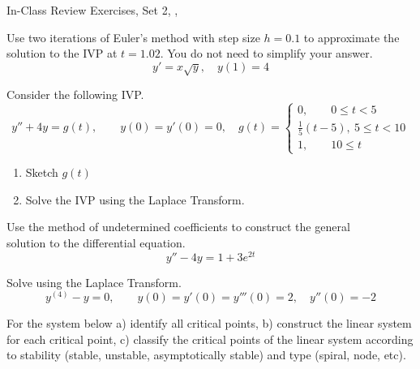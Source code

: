 \documentclass[12pt]{exam}
\newcommand{\TestName}{In-Class Review Exercises, Set 2}
\begin{document}
    

\begin{center}
{\Large \TestName, \Course, \Semester \ \Year}
\end{center}    



    
\begin{questions}

    

    \question Use two iterations of Euler's method with step size $h=0.1$ to approximate the solution to the IVP at $t = 1.02$. You do not need to simplify your answer. 
    $$y' = x\sqrt y, \quad y(1) = 4$$    

    
    \item Consider the following IVP. %
    $$y'' + 4y = g(t), \qquad y(0) = y'(0) = 0, \quad g(t) =  \begin{cases}
    0, \qquad 0 \le t < 5\\
    \frac15(t-5), \ 5 \le t < 10 \\
    1, \qquad 10 \le t
    \end{cases}
    $$
    \begin{enumerate}
        \item Sketch $g(t)$
        \item Solve the IVP using the Laplace Transform.
    \end{enumerate}    
    
    \item     Use the method of undetermined coefficients to construct the general \\ solution to the differential equation. 
    $$y'' - 4y = 1 + 3e^{2t}$$ 
    
    \item Solve using the Laplace Transform. %
    $$y^{(4)} - y = 0, \qquad y(0) = y'(0) = y'''(0) = 2, \quad y''(0) = -2 $$
    
    

        
        
    
    \question For the system below a) identify all critical points, b) construct the linear system for each critical point, c) classify the critical points of the linear system according to stability (stable, unstable, asymptotically stable) and type (spiral, node, etc).


\end{questions}
\end{document}
